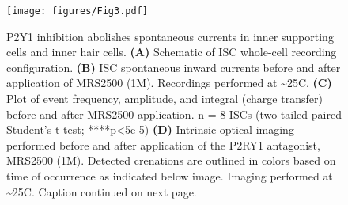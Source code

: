 \documentclass[9pt,lineno]{elife}
\begin{document}
\begin{figure}
\begin{fullwidth}
\begin{center}
\texttt{[image: figures/Fig3.pdf]}
\end{center}
\caption{P2Y1 inhibition abolishes spontaneous currents in inner supporting cells and inner hair cells.
\textbf{(A)} Schematic of ISC whole-cell recording configuration.
\textbf{(B)} ISC spontaneous inward currents before and after application of MRS2500 (1\textmu M). Recordings performed at \textasciitilde 25\textdegree C.
\textbf{(C)} Plot of event frequency, amplitude, and integral (charge transfer) before and after MRS2500 application. n = 8 ISCs (two-tailed paired Student’s t test; ****p<5e-5)
\textbf{(D)} Intrinsic optical imaging performed before and after application of the P2RY1 antagonist, MRS2500 (1\textmu M). Detected crenations are outlined in colors based on time of occurrence as indicated below image. Imaging performed at \textasciitilde 25\textdegree C. Caption continued on next page.
}
\label{fig:f3}
\end{fullwidth}
\end{figure}
\addtocounter{figure}{-1}
\end{document}

